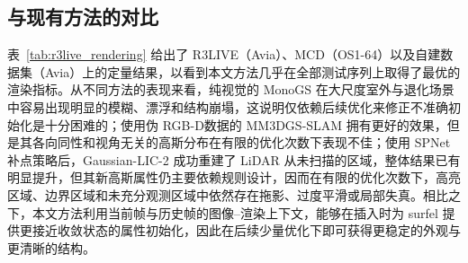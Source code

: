 \subsection{与现有方法的对比}

表~\ref{tab:r3live_rendering} 给出了 R3LIVE（Avia）、MCD（OS1-64）以及自建数据集（Avia）上的定量结果，以看到本文方法几乎在全部测试序列上取得了最优的渲染指标。从不同方法的表现来看，纯视觉的 MonoGS 在大尺度室外与退化场景中容易出现明显的模糊、漂浮和结构崩塌，这说明仅依赖后续优化来修正不准确初始化是十分困难的；使用伪 RGB-D数据的 MM3DGS-SLAM 拥有更好的效果，但是其各向同性和视角无关的高斯分布在有限的优化次数下表现不佳；使用 SPNet 补点策略后，Gaussian-LIC-2 成功重建了 LiDAR 从未扫描的区域，整体结果已有明显提升，但其新高斯属性仍主要依赖规则设计，因而在有限的优化次数下，高亮区域、边界区域和未充分观测区域中依然存在拖影、过度平滑或局部失真。相比之下，本文方法利用当前帧与历史帧的图像--渲染上下文，能够在插入时为 surfel 提供更接近收敛状态的属性初始化，因此在后续少量优化下即可获得更稳定的外观与更清晰的结构。


